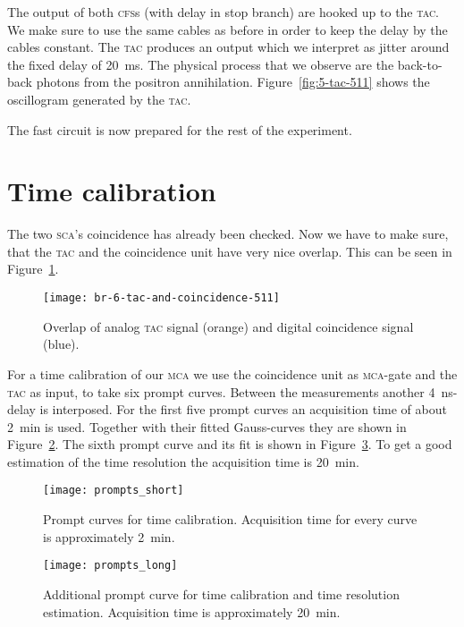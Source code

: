 \documentclass[11pt, english, fleqn, DIV=15, headinclude, BCOR=2cm]{scrreprt}
\begin{document}
The output of both \textsc{cfs}s (with delay in stop branch) are hooked up to
the \textsc{tac}. We make sure to use the same cables as before in order to
keep the delay by the cables constant. The \textsc{tac} produces an output
which we interpret as jitter around the fixed delay of \SI{20}{\milli\second}.
The physical process that we observe are the back-to-back photons from the
positron annihilation. Figure~\ref{fig:5-tac-511} shows the oscillogram
generated by the \textsc{tac}.

The fast circuit is now prepared for the rest of the experiment.

\section{Time calibration}

The two \textsc{sca}'s coincidence has already been checked. Now we have to
make sure, that the \textsc{tac} and the coincidence unit have very nice
overlap. This can be seen in Figure~\ref{fig:6-tac-and-coincidence-511}.

\begin{figure}
    \centering
    \texttt{[image: br-6-tac-and-coincidence-511]}
    \caption{%
        Overlap of analog \textsc{tac} signal (orange) and digital coincidence
        signal (blue).
    }
    \label{fig:6-tac-and-coincidence-511}
\end{figure}

For a time calibration of our \textsc{mca} we use the coincidence unit as
\textsc{mca}-gate and the \textsc{tac} as input, to take six prompt curves.
Between the measurements another \SI{4}{\nano\second}-delay is interposed. For
the first five prompt curves an acquisition time of about \SI{2}{\minute} is
used.  Together with their fitted Gauss-curves they are shown in
Figure~\ref{fig:prompts_short}. The sixth prompt curve and its fit is shown in
Figure~\ref{fig:prompts_long}. To get a good estimation of the time resolution
the acquisition time is \SI{20}{\minute}.

\begin{figure}
\centering
        \texttt{[image: prompts\_short]}
        \caption{%
                Prompt curves for time calibration. Acquisition time for every
                curve is approximately \SI{2}{\minute}.
        }
        \label{fig:prompts_short}
\end{figure}
        
\begin{figure}
\centering
        \texttt{[image: prompts\_long]}
        \caption{%
                Additional prompt curve for time calibration and time
                resolution estimation. Acquisition time is approximately
                \SI{20}{\minute}.
        }
        \label{fig:prompts_long}
\end{figure}
\end{document}
